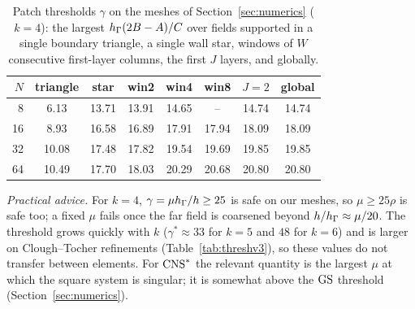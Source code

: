 \begin{table}[t]
\centering\small
\caption{Patch thresholds $\gamma$ on the meshes of Section~\ref{sec:numerics} ($k=4$): the largest $h_\Gamma(2B-A)/C$ over fields supported in a single boundary triangle, a single wall star, windows of $W$ consecutive first-layer columns, the first $J$ layers, and globally.}\label{tab:patch}
\begin{tabular}{rccccccc}
\toprule
$N$ & triangle & star & win2 & win4 & win8 & $J=2$ & global\\
\midrule
8 & 6.13 & 13.71 & 13.91 & 14.65 & -- & 14.74 & 14.74\\
16 & 8.93 & 16.58 & 16.89 & 17.91 & 17.94 & 18.09 & 18.09\\
32 & 10.08 & 17.48 & 17.82 & 19.54 & 19.69 & 19.85 & 19.85\\
64 & 10.49 & 17.70 & 18.03 & 20.29 & 20.68 & 20.80 & 20.80\\
\bottomrule
\end{tabular}
\end{table}

\emph{Practical advice.} For $k=4$, $\gamma=\mu h_\Gamma/h\ge25$ is safe on our meshes, so $\mu\ge25\rho$ is safe too; a fixed $\mu$ fails once the far field is coarsened beyond $h/h_\Gamma\approx\mu/20$. The threshold grows quickly with $k$ ($\gamma^\ast\approx33$ for $k=5$ and $48$ for $k=6$) and is larger on Clough--Tocher refinements (Table~\ref{tab:threshv3}), so these values do not transfer between elements. For $\mathrm{CNS}^\ast$ the relevant quantity is the largest $\mu$ at which the square system is singular; it is somewhat above the $\mathrm{GS}$ threshold (Section~\ref{sec:numerics}).

